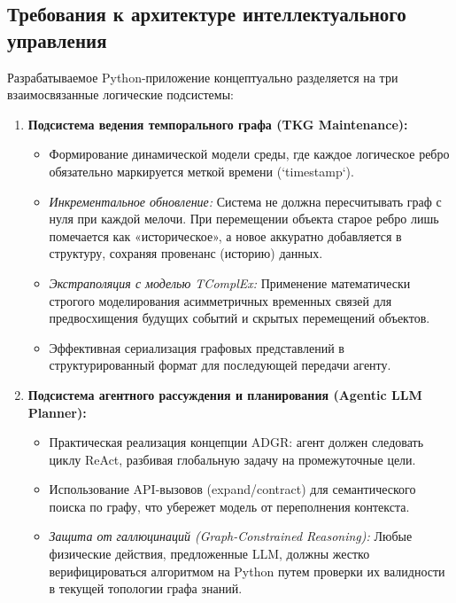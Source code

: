 \subsection*{Требования к архитектуре интеллектуального управления}

Разрабатываемое Python-приложение концептуально разделяется на три взаимосвязанные логические подсистемы:

\begin{enumerate}
    \item \textbf{Подсистема ведения темпорального графа (TKG Maintenance):}
    \begin{itemize}
        \item Формирование динамической модели среды, где каждое логическое ребро обязательно маркируется меткой времени (`timestamp`).
        \item \textit{Инкрементальное обновление:} Система не должна пересчитывать граф с нуля при каждой мелочи. При перемещении объекта старое ребро лишь помечается как «историческое», а новое аккуратно добавляется в структуру, сохраняя провенанс (историю) данных.
        \item \textit{Экстраполяция с моделью TComplEx:} Применение математически строгого моделирования асимметричных временных связей для предвосхищения будущих событий и скрытых перемещений объектов.
        \item Эффективная сериализация графовых представлений в структурированный формат для последующей передачи агенту.
    \end{itemize}
    
    \item \textbf{Подсистема агентного рассуждения и планирования (Agentic LLM Planner):}
    \begin{itemize}
        \item Практическая реализация концепции ADGR: агент должен следовать циклу ReAct, разбивая глобальную задачу на промежуточные цели.
        \item Использование API-вызовов (expand/contract) для семантического поиска по графу, что убережет модель от переполнения контекста.
        \item \textit{Защита от галлюцинаций (Graph-Constrained Reasoning):} Любые физические действия, предложенные LLM, должны жестко верифицироваться алгоритмом на Python путем проверки их валидности в текущей топологии графа знаний.
    \end{itemize}
    

\end{enumerate}
